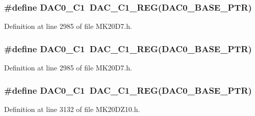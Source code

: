 \subsubsection[{\texorpdfstring{D\+A\+C0\+\_\+\+C1}{DAC0_C1}}]{\setlength{\rightskip}{0pt plus 5cm}\#define D\+A\+C0\+\_\+\+C1~{\bf D\+A\+C\+\_\+\+C1\+\_\+\+R\+EG}({\bf D\+A\+C0\+\_\+\+B\+A\+S\+E\+\_\+\+P\+TR})}\hypertarget{group___d_a_c___register___accessor___macros_ga54148f65bd470a8414d0de17427b3c50}{}\label{group___d_a_c___register___accessor___macros_ga54148f65bd470a8414d0de17427b3c50}


Definition at line 2985 of file M\+K20\+D7.\+h.

\subsubsection[{\texorpdfstring{D\+A\+C0\+\_\+\+C1}{DAC0_C1}}]{\setlength{\rightskip}{0pt plus 5cm}\#define D\+A\+C0\+\_\+\+C1~{\bf D\+A\+C\+\_\+\+C1\+\_\+\+R\+EG}({\bf D\+A\+C0\+\_\+\+B\+A\+S\+E\+\_\+\+P\+TR})}\hypertarget{group___d_a_c___register___accessor___macros_ga54148f65bd470a8414d0de17427b3c50}{}\label{group___d_a_c___register___accessor___macros_ga54148f65bd470a8414d0de17427b3c50}


Definition at line 2985 of file M\+K20\+D7.\+h.

\subsubsection[{\texorpdfstring{D\+A\+C0\+\_\+\+C1}{DAC0_C1}}]{\setlength{\rightskip}{0pt plus 5cm}\#define D\+A\+C0\+\_\+\+C1~{\bf D\+A\+C\+\_\+\+C1\+\_\+\+R\+EG}({\bf D\+A\+C0\+\_\+\+B\+A\+S\+E\+\_\+\+P\+TR})}\hypertarget{group___d_a_c___register___accessor___macros_ga54148f65bd470a8414d0de17427b3c50}{}\label{group___d_a_c___register___accessor___macros_ga54148f65bd470a8414d0de17427b3c50}


Definition at line 3132 of file M\+K20\+D\+Z10.\+h.

